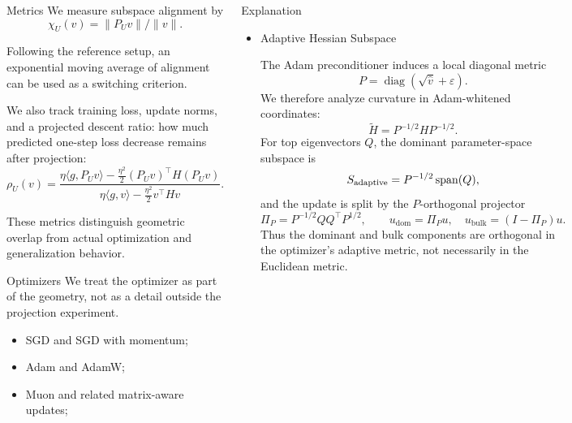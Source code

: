 \documentclass[final]{beamer}
\begin{document}
\begin{frame}[t]
\begin{columns}[T,totalwidth=\textwidth]
\begin{postercol}
    \vspace{2.55cm}
    
    \begin{posterblock}{Metrics}
      We measure subspace alignment by
      \[
        \chi_U(v)=\|P_U v\| / \|v\|.
      \]

      Following the reference setup, an exponential moving average of alignment can be used as a switching criterion.

      We also track training loss, update norms, and a projected descent ratio: how much predicted one-step loss decrease remains after projection:
      \[
      \rho_U(v)
      =
      \frac{
      \eta \langle g, P_U v\rangle
      -
      \frac{\eta^2}{2}(P_Uv)^\top H(P_Uv)
      }{
      \eta \langle g, v\rangle
      -
      \frac{\eta^2}{2}v^\top H v
      }.
      \]

      These metrics distinguish geometric overlap from actual optimization and generalization behavior.
    \end{posterblock}

    \vspace{2.55cm}

    \begin{posterblock}{Optimizers}
      We treat the optimizer as part of the geometry, not as a detail outside the projection experiment.
      \begin{itemize}
        \item SGD and SGD with momentum;
        \item Adam and AdamW;
        \item Muon and related matrix-aware updates;
      \end{itemize}
    \end{posterblock}
  \end{postercol}

  \begin{postercol}

    \begin{highlightblock}{Explanation}
      \begin{itemize}
        \item Adaptive Hessian Subspace

          The Adam preconditioner induces a local diagonal metric
\[
P=\operatorname{diag}(\sqrt{\widehat v}+\varepsilon).
\]
We therefore analyze curvature in Adam-whitened coordinates:
\[
\widetilde H=P^{-1/2}HP^{-1/2}.
\]
For top eigenvectors \(Q\), the dominant parameter-space subspace is
\[
S_{\rm adaptive}=P^{-1/2}\operatorname{span}(Q),
\]
and the update is split by the \(P\)-orthogonal projector
\[
\Pi_P=P^{-1/2}QQ^\top P^{1/2},
\qquad
u_{\mathrm{dom}}=\Pi_Pu,\quad
u_{\mathrm{bulk}}=(I-\Pi_P)u .
\]
Thus the dominant and bulk components are orthogonal in the optimizer’s adaptive metric, not necessarily in the Euclidean metric.\\[1.0em]



\end{itemize}
\end{highlightblock}
\end{postercol}
\end{columns}
\end{frame}
\end{document}
